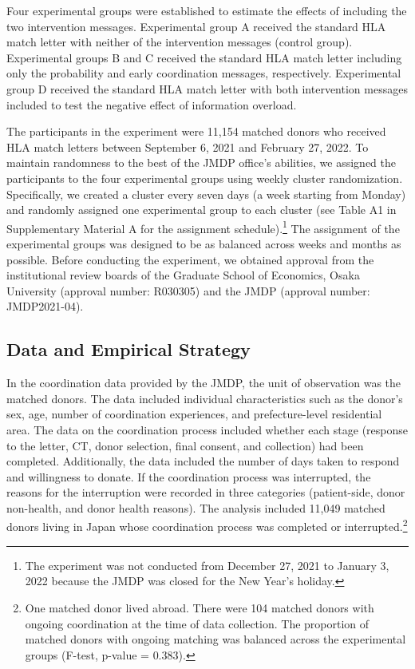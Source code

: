 \documentclass[12pt, a4paper]{article}
\begin{document}
Four experimental groups were established to estimate the effects of including the two intervention messages. Experimental group A received the standard HLA match letter with neither of the intervention messages (control group). Experimental groups B and C received the standard HLA match letter including only the probability and early coordination messages, respectively. Experimental group D received the standard HLA match letter with both intervention messages included to test the negative effect of information overload.

The participants in the experiment were 11,154 matched donors who received HLA match letters between September 6, 2021 and February 27, 2022. To maintain randomness to the best of the JMDP office's abilities, we assigned the participants to the four experimental groups using weekly cluster randomization. Specifically, we created a cluster every seven days (a week starting from Monday) and randomly assigned one experimental group to each cluster (see Table A1 in Supplementary Material A for the assignment schedule).\footnote{The experiment was not conducted from December 27, 2021 to January 3, 2022 because the JMDP was closed for the New Year's holiday.} The assignment of the experimental groups was designed to be as balanced across weeks and months as possible. Before conducting the experiment, we obtained approval from the institutional review boards of the Graduate School of Economics, Osaka University (approval number: R030305) and the JMDP (approval number: JMDP2021-04).

\subsection{Data and Empirical Strategy}\label{data-and-empirical-strategy}

In the coordination data provided by the JMDP, the unit of observation was the matched donors. The data included individual characteristics such as the donor's sex, age, number of coordination experiences, and prefecture-level residential area. The data on the coordination process included whether each stage (response to the letter, CT, donor selection, final consent, and collection) had been completed. Additionally, the data included the number of days taken to respond and willingness to donate. If the coordination process was interrupted, the reasons for the interruption were recorded in three categories (patient-side, donor non-health, and donor health reasons). The analysis included 11,049 matched donors living in Japan whose coordination process was completed or interrupted.\footnote{One matched donor lived abroad. There were 104 matched donors with ongoing coordination at the time of data collection. The proportion of matched donors with ongoing matching was balanced across the experimental groups (F-test, p-value = \(0.383\)).}
\end{document}
